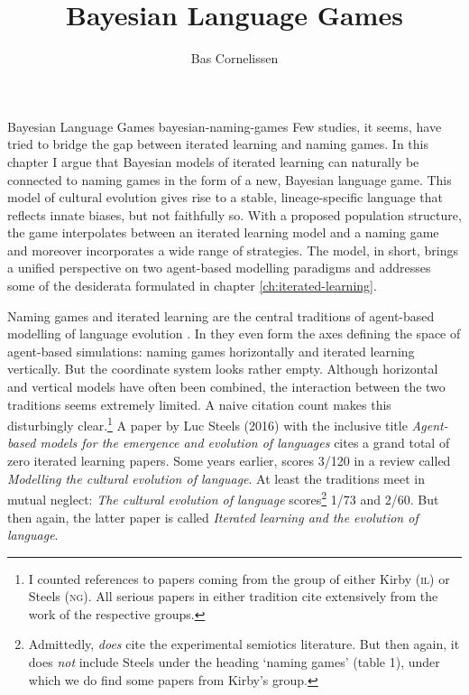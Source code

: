 \documentclass{../src/bcthesispart}
\title{Bayesian Language Games}
\author{Bas Cornelissen}
\begin{document}
%
	{Bayesian Language Games}%
	{bayesian-naming-games}%
	{%
	Few studies, it seems, have tried to bridge the gap between iterated learning and naming games.
	In this chapter I argue that Bayesian models of iterated learning can naturally be connected to naming games in the form of a new, Bayesian language game.
	This model of cultural evolution gives rise to a stable, lineage-specific language that reflects innate biases, but not faithfully so.
	With a proposed population structure, the game interpolates between an iterated learning model and a naming game and moreover incorporates a wide range of strategies.
	The model, in short, brings a unified perspective on two agent-based modelling paradigms and addresses some of the desiderata formulated in chapter \ref{ch:iterated-learning}.
	}




\noindent
Naming games and iterated learning are the central traditions of agent-based modelling of language evolution \parencite{Smith2014,Grifoni2016,Jaeger2009}.
In \textcite{Jaeger2009} they even form the axes defining the space of agent-based simulations: naming games horizontally and iterated learning vertically.
But the coordinate system looks rather empty.
Although horizontal and vertical models have often been combined, the interaction between the two traditions seems extremely limited.
A naive citation count makes this disturbingly clear.\footnote{%
	I counted references to papers coming from the group of either Kirby (\textsc{il}) or Steels (\textsc{ng}). 
	All serious papers in either tradition cite extensively from the work of the respective groups.
}
A paper by Luc Steels (2016) \nocite{Steels2016} with the inclusive title \emph{Agent-based models for the emergence and evolution of languages} cites a grand total of zero iterated learning papers.
Some years earlier, \textcite{Steels2011} scores 3/120 in a review called \emph{Modelling the cultural evolution of language}.
At least the traditions meet in mutual neglect:
\emph{The cultural evolution of language} \parencite{Tamariz2016} scores\footnote{%
	Admittedly, \textcite{Tamariz2016} \emph{does} cite the experimental semiotics literature. But then again, it does \emph{not} include Steels under the heading ‘naming games’ (table 1), under which we do find some papers from Kirby’s group.
	}
1/73 and \textcite{Kirby2014} 2/60. 
But then again, the latter paper is called \emph{Iterated learning and the evolution of language}.
 
\end{document}
